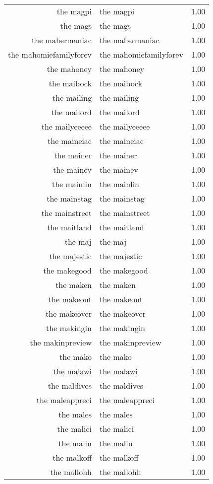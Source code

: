\begin{table}[ht]
\begin{tabular}{rlr}
  the magpi & the magpi & 1.00 \\ 
  the mags & the mags & 1.00 \\ 
  the mahermaniac & the mahermaniac & 1.00 \\ 
  the mahomiefamilyforev & the mahomiefamilyforev & 1.00 \\ 
  the mahoney & the mahoney & 1.00 \\ 
  the maibock & the maibock & 1.00 \\ 
  the mailing & the mailing & 1.00 \\ 
  the mailord & the mailord & 1.00 \\ 
  the mailyeeeee & the mailyeeeee & 1.00 \\ 
  the maineiac & the maineiac & 1.00 \\ 
  the mainer & the mainer & 1.00 \\ 
  the mainev & the mainev & 1.00 \\ 
  the mainlin & the mainlin & 1.00 \\ 
  the mainstag & the mainstag & 1.00 \\ 
  the mainstreet & the mainstreet & 1.00 \\ 
  the maitland & the maitland & 1.00 \\ 
  the maj & the maj & 1.00 \\ 
  the majestic & the majestic & 1.00 \\ 
  the makegood & the makegood & 1.00 \\ 
  the maken & the maken & 1.00 \\ 
  the makeout & the makeout & 1.00 \\ 
  the makeover & the makeover & 1.00 \\ 
  the makingin & the makingin & 1.00 \\ 
  the makinpreview & the makinpreview & 1.00 \\ 
  the mako & the mako & 1.00 \\ 
  the malawi & the malawi & 1.00 \\ 
  the maldives & the maldives & 1.00 \\ 
  the maleappreci & the maleappreci & 1.00 \\ 
  the males & the males & 1.00 \\ 
  the malici & the malici & 1.00 \\ 
  the malin & the malin & 1.00 \\ 
  the malkoff & the malkoff & 1.00 \\ 
  the mallohh & the mallohh & 1.00 \\ 

\end{tabular}
\end{table}
